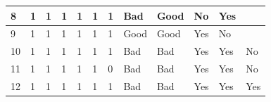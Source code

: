 \begin{table}[H]
\begin{tabular}{|l|l|l|l|l|l|l|l|l|l|l|l|}
8                                                           & 1  & 1    & 1   & 1     & 1    & 1                                                                     & Bad                                                     & Good                                                     & No                                                                    & Yes                                                                   &                                                                       \\ \hline
9                                                           & 1  & 1    & 1   & 1     & 1    & 1                                                                     & Good                                                    & Good                                                     & Yes                                                                   & No                                                                    &                                                                       \\ \hline
10                                                          & 1  & 1    & 1   & 1     & 1    & 1                                                                     & Bad                                                     & Bad                                                      & Yes                                                                   & Yes                                                                   & No                                                                    \\ \hline
11                                                          & 1  & 1    & 1   & 1     & 1    & 0                                                                     & Bad                                                     & Bad                                                      & Yes                                                                   & Yes                                                                   & No                                                                    \\ \hline
12                                                          & 1  & 1    & 1   & 1     & 1    & 1                                                                     & Bad                                                     & Bad                                                      & Yes                                                                   & Yes                                                                   & Yes                                                                   \\ \hline

\end{tabular}
\end{table}
